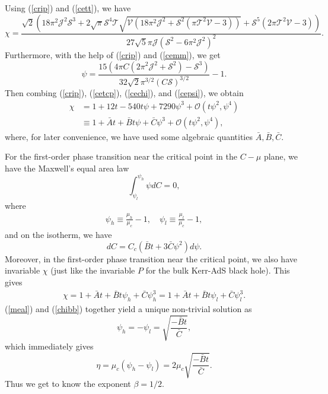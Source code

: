 \documentclass[a4paper,11pt]{article}
\newcommand{\eq}[1]{(\ref{#1})}
\def\T{\mathcal{T}} \def\O{\mathcal{O}} \def\S{\mathcal{S}}\def\J{\mathcal{J}}\def\V{\mathcal{V}}\def\Q{\mathcal{Q}}\def\F{\mathcal{F}}
\begin{document}
Using \eq{crip} and \eq{cett}, we have
\begin{equation}\label{cechi}
\chi=\frac{\sqrt{2} \left(18 \pi ^2 \mathcal{J}^2 \mathcal{S}^3+2 \sqrt{\pi }\S^4\T \sqrt{ \mathcal{V} \left(18 \pi ^2 \mathcal{J}^2+\mathcal{S}^2 \left(\pi  \mathcal{T}^2 \mathcal{V}-3\right)\right)}+\mathcal{S}^5 \left(2 \pi  \mathcal{T}^2 \mathcal{V}-3\right)\right)}{27\sqrt{5} \pi  \mathcal{J} \left(\mathcal{S}^2-6 \pi ^2 \mathcal{J}^2\right)^2}.
\end{equation}
Furthermore, with the help of \eq{crip} and \eq{cemm}, we get
\begin{equation}\label{cepsi}
\psi=\frac{15 \left(4 \pi  C \left(2 \pi ^2 \mathcal{J}^2+\mathcal{S}^2\right)-\mathcal{S}^3\right)}{32 \sqrt{2} \pi ^{3/2} (C \mathcal{S})^{3/2}}-1.
\end{equation}
Then combing \eq{crip}, \eq{cetcp},  \eq{cechi}, and \eq{cepsi}, we obtain
\begin{equation}\label{chitpsi}
\begin{aligned}
\chi&=1+12t-540 t \psi +7290 \psi ^3+\O\left(t \psi^2, \psi^4\right)\\
&\equiv1+\bar{A}t+\bar{B}t\psi+\bar{C}\psi^3+\O\left(t \psi^2, \psi^4\right),
\end{aligned}
\end{equation}
where, for later convenience, we have used some algebraic quantities $\bar{A}, \bar{B}, \bar{C}$. 

For the first-order phase transition near the critical point in the $C-\mu$ plane, we have the Maxwell's equal area law
\begin{equation}\label{meal}
\int_{\psi_l}^{\psi_h}\psi dC=0,
\end{equation}
where 
\begin{align}
\psi_h\equiv\frac{\mu_h}{ \mu_c}-1,\quad
\psi_l\equiv\frac{\mu_l}{ \mu_c}-1,
\end{align}
and on the isotherm, we have 
\begin{equation}
d C=C_c\left(\bar{B} t+3 \bar{C} \psi ^2\right) d \psi.
\end{equation}
Moreover, in the first-order phase transition near the critical point, we also have invariable $\chi$ (just like the invariable $P$ for the bulk Kerr-AdS black hole). This gives
\begin{equation}\label{chibb}
\begin{aligned}
\chi=1+\bar{A}t+\bar{B}t\psi_h+\bar{C}\psi^3_h=1+\bar{A}t+\bar{B}t\psi_l+\bar{C}\psi^3_l.
\end{aligned}
\end{equation}
\eq{meal} and \eq{chibb} together yield a  unique non-trivial solution as
\begin{equation}
\psi_h=-\psi_l=\sqrt{\frac{-\bar{B} t}{\bar{C}}},
\end{equation}
which immediately gives
\begin{equation}
\eta=\mu_{c}\left(\psi_h-\psi_l\right)=2\mu_{c}\sqrt{\frac{-\bar{B} t}{\bar{C}}}.
\end{equation}
Thus we get to know the exponent $\beta=1 / 2$.
\end{document}
